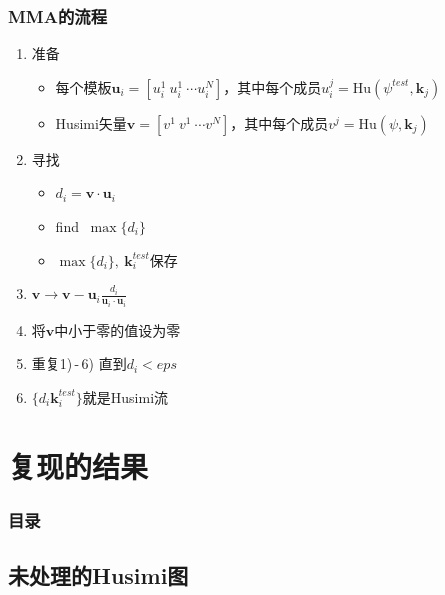 \documentclass[UTF8]{beamer}
\begin{document}
\begin{frame}[allowframebreaks]
    \frametitle{\textbf{MMA}的流程}
    \begin{enumerate}
        \item 准备
              \begin{itemize}
                  \item 每个模板$\mathbf{u}_i=[u_i^1\ u_i^1\ \cdots u_i^N]$，其中每个成员$u_i^j=\mathrm{Hu}(\psi^{test},\mathbf{k}_j)$
                  \item Husimi矢量$\mathbf{v}=[v^1\ v^1\ \cdots v^N]$，其中每个成员$v^j=\mathrm{Hu}(\psi,\mathbf{k}_j)$
              \end{itemize}
        \item 寻找
              \begin{itemize}
                  \item $d_i = \mathbf{v}\cdot\mathbf{u}_i$
                  \item find $\ \max \{d_i\}$
                  \item $\max\{d_i\},\ \mathbf{k}_i^{test}$保存
              \end{itemize}
        \item $\mathbf{v}\rightarrow\mathbf{v}-\mathbf{u}_i\frac{d_i}{\mathbf{u}_i\cdot\mathbf{u}_i}$
        \item 将$\mathbf{v}$中小于零的值设为零
        \item 重复1)\,-\,6) 直到$d_i<eps$
        \item $\{d_i\mathbf{k}_i^{test}\}$就是Husimi流
    \end{enumerate}
\end{frame}

%
\section{复现的结果}
\begin{frame}\frametitle{目录}
    \tableofcontents[currentsection]
\end{frame}
\subsection{未处理的Husimi图}
\end{document}
